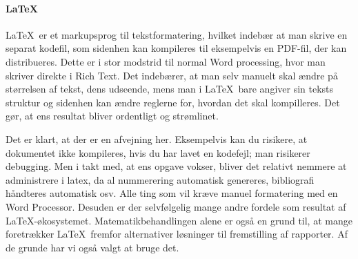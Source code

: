 \paragraph{\LaTeX}\label{sec:latexsoftware}
\LaTeX\ er et markupsprog til tekstformatering, hvilket indebær at man skrive en separat kodefil, som sidenhen kan kompileres til eksempelvis en PDF-fil, der kan distribueres. Dette er i stor modstrid til normal Word processing, hvor man skriver direkte i Rich Text. Det indebærer, at man selv manuelt skal ændre på størrelsen af tekst, dens udseende, mens man i \LaTeX\ bare angiver sin teksts struktur og sidenhen kan ændre reglerne for, hvordan det skal kompilleres. Det gør, at ens resultat bliver ordentligt og strømlinet.

Det er klart, at der er en afvejning her. Eksempelvis kan du risikere, at dokumentet ikke kompileres, hvis du har lavet en kodefejl; man risikerer debugging. Men i takt med, at ens opgave vokser, bliver det relativt nemmere at administrere i latex, da al nummerering automatisk genereres, bibliografi håndteres automatisk osv. Alle ting som vil kræve manuel formatering med en Word Processor. Desuden er der selvfølgelig mange andre fordele som resultat af \LaTeX-økosystemet. Matematikbehandlingen alene er også en grund til, at mange foretrækker \LaTeX\ fremfor alternativer løsninger til fremstilling af rapporter. Af de grunde har vi også valgt at bruge det.
